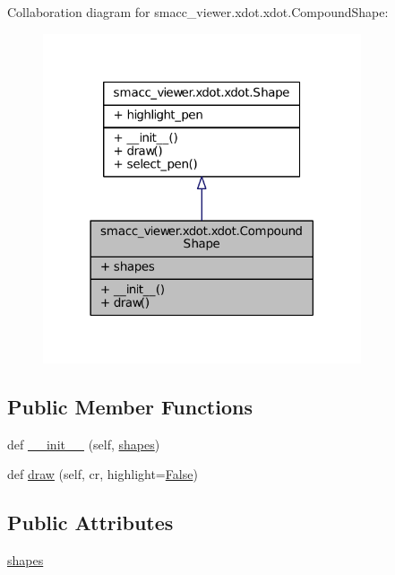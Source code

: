 Collaboration diagram for smacc\+\_\+viewer.\+xdot.\+xdot.\+Compound\+Shape\+:
\nopagebreak
\begin{figure}[H]
\begin{center}
\leavevmode
\includegraphics[width=266pt]{classsmacc__viewer_1_1xdot_1_1xdot_1_1CompoundShape__coll__graph}
\end{center}
\end{figure}
\subsection*{Public Member Functions}
\begin{DoxyCompactItemize}
\item 
def \hyperlink{classsmacc__viewer_1_1xdot_1_1xdot_1_1CompoundShape_abf5f3cfe2d369a07d5feefed0a9ad094}{\+\_\+\+\_\+init\+\_\+\+\_\+} (self, \hyperlink{classsmacc__viewer_1_1xdot_1_1xdot_1_1CompoundShape_af10de5e0141d75d95ad8b85cb7baf7ea}{shapes})
\item 
def \hyperlink{classsmacc__viewer_1_1xdot_1_1xdot_1_1CompoundShape_a630710857afeb9201f7bc2c0f68af8c7}{draw} (self, cr, highlight=\hyperlink{namespacesmacc__viewer_a5928e8da279785cbab9011356c3eaa87}{False})
\end{DoxyCompactItemize}
\subsection*{Public Attributes}
\begin{DoxyCompactItemize}
\item 
\hyperlink{classsmacc__viewer_1_1xdot_1_1xdot_1_1CompoundShape_af10de5e0141d75d95ad8b85cb7baf7ea}{shapes}
\end{DoxyCompactItemize}


